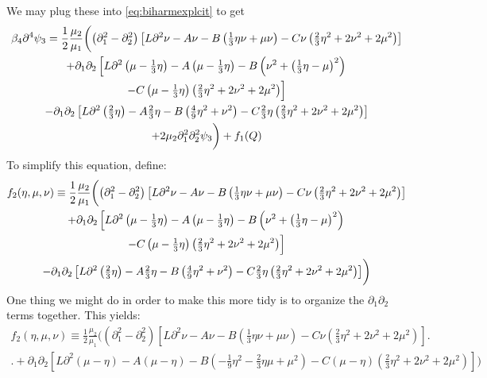\documentclass[reqno]{article}
\begin{document}
	We may plug these into \eqref{eq:biharmexplcit} to get
	\begin{multline}
		\beta_4 \partial^4 \psi_3 = \frac12 \frac{\mu_2}{\mu_1} \biggl( \left( \partial_1^2 - \partial_2^2\right)\left[ L\partial^2 \nu - A\nu - B\left(\tfrac{1}{3}\eta\nu + \mu\nu\right) - C\nu\left( \tfrac{2}{3}\eta^2 + 2\nu^2 + 2\mu^2 \right) \right]\biggr. \\
		+ \partial_1\partial_2 \left[ L\partial^2 \left( \mu - \tfrac{1}{3}\eta \right) - A\left( \mu - \tfrac{1}{3}\eta \right) - B\left( \nu^2 + 
		\left( \tfrac{1}{3}\eta - \mu \right)^2 \right)\right. \\
		\Bigl.- C\left( \mu - \tfrac{1}{3}\eta \right)\left( \tfrac{2}{3}\eta^2 + 2\nu^2 + 2\mu^2 \right) \Bigr] \\
		- \partial_1\partial_2 \left[L\partial^2 \left( \tfrac{2}{3}\eta \right) - A \tfrac{2}{3}\eta - B\left( \tfrac{4}{9}\eta^2 + \nu^2 \right) - C \tfrac{2}{3}\eta \left( \tfrac{2}{3}\eta^2 + 2\nu^2 + 2\mu^2 \right) \right] \\
		\biggl. + 2\mu_2 \partial_1^2\partial_2^2 \psi_3 \biggr) + f_1(Q) \\
	\end{multline}
	To simplify this equation, define:
	\begin{multline} \label{eq:f2-1}
		f_2(\eta, \mu, \nu) \equiv \frac12 \frac{\mu_2}{\mu_1} \biggl( \left( \partial_1^2 - \partial_2^2\right)\left[ L\partial^2 \nu - A\nu - B\left(\tfrac{1}{3}\eta\nu + \mu\nu\right) - C\nu\left( \tfrac{2}{3}\eta^2 + 2\nu^2 + 2\mu^2 \right) \right]\biggr. \\
		+ \partial_1\partial_2 \left[ L\partial^2 \left( \mu - \tfrac{1}{3}\eta \right) - A\left( \mu - \tfrac{1}{3}\eta \right) - B\left( \nu^2 + 
		\left( \tfrac{1}{3}\eta - \mu \right)^2 \right)\right. \\
		\Bigl.- C\left( \mu - \tfrac{1}{3}\eta \right)\left( \tfrac{2}{3}\eta^2 + 2\nu^2 + 2\mu^2 \right) \Bigr] \\
		\biggl.- \partial_1\partial_2 \left[L\partial^2 \left( \tfrac{2}{3}\eta \right) - A \tfrac{2}{3}\eta - B\left( \tfrac{4}{9}\eta^2 + \nu^2 \right) - C \tfrac{2}{3}\eta \left( \tfrac{2}{3}\eta^2 + 2\nu^2 + 2\mu^2 \right) \right] \biggr)
	\end{multline}
	One thing we might do in order to make this more tidy is to organize the $\partial_1\partial_2$ terms together. This yields:
	\begin{multline}
		f_2(\eta, \mu, \nu) \equiv \frac12 \frac{\mu_2}{\mu_1} \biggl( \left( \partial_1^2 - \partial_2^2\right)\left[ L\partial^2 \nu - A\nu - B\left(\tfrac{1}{3}\eta\nu + \mu\nu\right) - C\nu\left( \tfrac{2}{3}\eta^2 + 2\nu^2 + 2\mu^2 \right) \right]\biggr. \\
		\biggl. + \partial_1\partial_2 \left[ L\partial^2 \left( \mu - \eta \right) - A\left( \mu - \eta \right) - B\left( -\tfrac19 \eta^2 - \tfrac23 \eta\mu + \mu^2 \right) - C\left( \mu - \eta\right) \left( \tfrac23 \eta^2 + 2\nu^2 + 2\mu^2 \right)\right] \biggr) 
	\end{multline}
\end{document}
